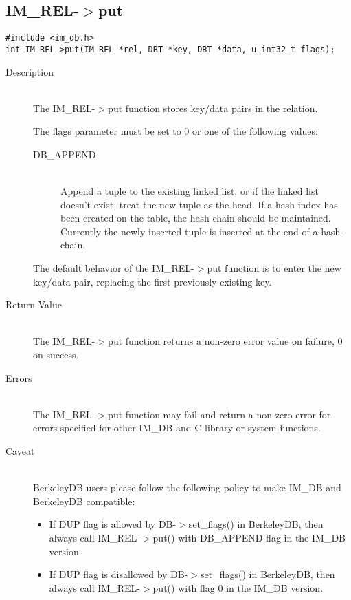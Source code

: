 \documentclass[11pt]{article}
\def\cdf{\sf }
\def\cdf{\sf }
\newcommand{\IMDB}{{\small{\cdf IM\_DB}}}
\newcommand{\IMREL}{{\small{\cdf IM\_REL}}}
\newcommand{\DBAPPEND}{{\small{\cdf DB\_APPEND}}}
\begin{document}
\subsection{{\IMREL}-$>$put}
\begin{verbatim}
#include <im_db.h>
int IM_REL->put(IM_REL *rel, DBT *key, DBT *data, u_int32_t flags);
\end{verbatim}
\begin{description}
\item[Description]\ \\
  The {\IMREL}-$>$put function stores key/data pairs in the relation. 

  The flags parameter must be set to 0 or one of the following values: 
  \begin{description}
  \item[{\DBAPPEND}]\ \\
    Append a tuple to the existing linked list, or if the linked list
    doesn't exist, treat the new tuple as the head.  If a hash index
    has been created on the table, the hash-chain should be
    maintained.  Currently the newly inserted tuple is inserted at the
    end of a hash-chain.
  \end{description}

  The default behavior of the {\IMREL}-$>$put function is to enter the
  new key/data pair, replacing the first previously existing key.
\item[Return Value]\ \\
  The {\IMREL}-$>$put function returns a non-zero error value on
  failure, 0 on success.
\item[Errors]\ \\
  The {\IMREL}-$>$put function may fail and return a non-zero error
  for errors specified for other {\IMDB} and C library or system
  functions.
\item[Caveat]\ \\
  BerkeleyDB users please follow the following policy to make {\IMDB}
  and BerkeleyDB compatible:
  \begin{itemize}
  \item If DUP flag is allowed by DB-$>$set\_flags() in BerkeleyDB,
        then always call {\IMREL}-$>$put() with {\DBAPPEND} flag in
        the {\IMDB} version.
  \item If DUP flag is disallowed by DB-$>$set\_flags() in BerkeleyDB,
        then always call {\IMREL}-$>$put() with flag 0 in
        the {\IMDB} version.
  \end{itemize}
\end{description}
\end{document}
